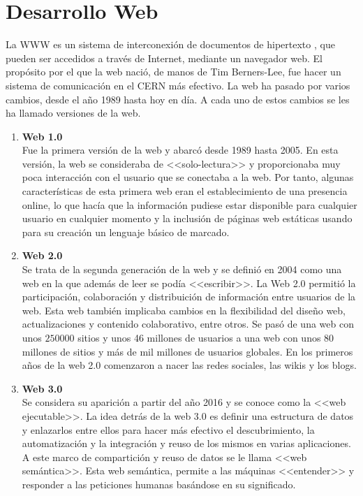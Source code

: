 \section{Desarrollo Web}

La \ac{WWW} es un sistema de interconexión de documentos de hipertexto \cite{31}, que pueden ser accedidos a través de Internet, mediante un navegador web. El propósito por el que la web nació, de manos de Tim Berners-Lee, fue hacer un sistema de comunicación en el \ac{CERN} más efectivo. La web ha pasado por varios cambios, desde el año 1989 hasta hoy en día. A cada uno de estos cambios se les ha llamado versiones de la web.

\begin{enumerate}
\item \textbf{Web 1.0} \\ Fue la primera versión de la web y abarcó desde 1989 hasta 2005. En esta versión, la web se consideraba de <<solo-lectura>> y proporcionaba muy poca interacción con el usuario que se conectaba a la web. Por tanto, algunas características de esta primera web eran el establecimiento de una presencia online, lo que hacía que la información pudiese estar disponible para cualquier usuario en cualquier momento y la inclusión de páginas web estáticas usando para su creación un lenguaje básico de marcado.

\item \textbf{Web 2.0} \\ Se trata de la segunda generación de la web y se definió en 2004 como una web en la que además de leer se podía <<escribir>>. La Web 2.0 permitió la participación, colaboración y distribuición de información entre usuarios de la web. Esta web también implicaba cambios en la flexibilidad del diseño web, actualizaciones y contenido colaborativo, entre otros. Se pasó de una web con unos $250000$ sitios y unos 46 millones de usuarios a una web con unos 80 millones de sitios y más de mil millones de usuarios globales. En los primeros años de la web 2.0 comenzaron a nacer las redes sociales, las wikis y los blogs.

\item \textbf{Web 3.0} \\ Se considera su aparición a partir del año 2016 y se conoce como la <<web ejecutable>>. La idea detrás de la web 3.0 es definir una estructura de datos y enlazarlos entre ellos para hacer más efectivo el descubrimiento, la automatización y la integración y reuso de los mismos en varias aplicaciones. A este marco de compartición y reuso de datos se le llama <<web semántica>>. Esta web semántica, permite a las máquinas <<entender>> y responder a las peticiones humanas basándose en su significado.
\end{enumerate}


